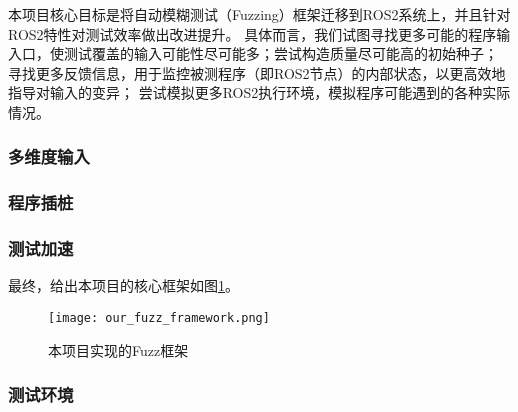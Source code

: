 本项目核心目标是将自动模糊测试（Fuzzing）框架迁移到ROS2系统上，并且针对ROS2特性对测试效率做出改进提升。
具体而言，我们试图寻找更多可能的程序输入口，使测试覆盖的输入可能性尽可能多；尝试构造质量尽可能高的初始种子；
寻找更多反馈信息，用于监控被测程序（即ROS2节点）的内部状态，以更高效地指导对输入的变异；
尝试模拟更多ROS2执行环境，模拟程序可能遇到的各种实际情况。

\subsubsection{多维度输入}
\subsubsection{程序插桩}
\subsubsection{测试加速}


最终，给出本项目的核心框架如图\ref{pic:off}。

\begin{figure}[h]
    \centering
    \texttt{[image: our\_fuzz\_framework.png]}
    \caption{本项目实现的Fuzz框架}
    \label{pic:off}
\end{figure}

\subsubsection{测试环境}